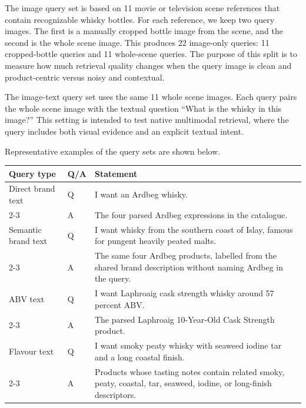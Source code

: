 The image query set is based on 11 movie or television scene references that contain recognizable whisky bottles. For each reference, we keep two query images. The first is a manually cropped bottle image from the scene, and the second is the whole scene image. This produces 22 image-only queries: 11 cropped-bottle queries and 11 whole-scene queries. The purpose of this split is to measure how much retrieval quality changes when the query image is clean and product-centric versus noisy and contextual.

The image-text query set uses the same 11 whole scene images. Each query pairs the whole scene image with the textual question ``What is the whisky in this image?'' This setting is intended to test native multimodal retrieval, where the query includes both visual evidence and an explicit textual intent.

Representative examples of the query sets are shown below.

\begin{center}
\begin{tabular}{p{}p{}p{}}
\hline
\textbf{Query type} & \textbf{Q/A} & \textbf{Statement} \\
\hline
Direct brand text & Q & I want an Ardbeg whisky. \\
\cline{2-3}
 & A & The four parsed Ardbeg expressions in the catalogue. \\
\hline
Semantic brand text & Q & I want whisky from the southern coast of Islay, famous for pungent heavily peated malts. \\
\cline{2-3}
 & A & The same four Ardbeg products, labelled from the shared brand description without naming Ardbeg in the query. \\
\hline
ABV text & Q & I want Laphroaig cask strength whisky around 57 percent ABV. \\
\cline{2-3}
 & A & The parsed Laphroaig 10-Year-Old Cask Strength product. \\
\hline
Flavour text & Q & I want smoky peaty whisky with seaweed iodine tar and a long coastal finish. \\
\cline{2-3}
 & A & Products whose tasting notes contain related smoky, peaty, coastal, tar, seaweed, iodine, or long-finish descriptors. \\
\hline
\end{tabular}
\end{center}

